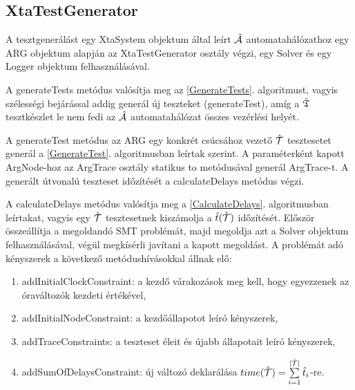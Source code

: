 \subsection{XtaTestGenerator}
A tesztgenerálást egy \textsf{XtaSystem} objektum által leírt $\hat{\mathcal{A}}$ automatahálózathoz egy \textsf{ARG} objektum alapján az \textsf{XtaTestGenerator} osztály végzi, egy \textsf{Solver} és egy \textsf{Logger} objektum felhasználásával.

A \textsf{generateTests} metódus valósítja meg az \ref{GenerateTests}. algoritmust, vagyis szélességi bejárással addig generál új teszteket (\textsf{generateTest}), amíg a $\hat{\mathfrak{T}}$ tesztkészlet le nem fedi az $\hat{\mathcal{A}}$ automatahálózat összes vezérlési helyét.

A \textsf{generateTest} metódus az ARG egy konkrét csúcsához vezető $\hat{\mathcal{T}}$ tesztesetet generál a \ref{GenerateTest}. algoritmusban leírtak szerint. A paraméterként kapott \textsf{ArgNode}-hoz az \textsf{ArgTrace} osztály statikus \textsf{to} metódusával generál \textsf{ArgTrace}-t. A generált útvonalú teszteset időzítését a \textsf{calculateDelays} metódus végzi.

A \textsf{calculateDelays} metódus valósítja meg a \ref{CalculateDelays}. algoritmusban leírtakat, vagyis egy $\hat{\mathcal{T}}$ tesztesetnek kiszámolja a $\hat{t}(\hat{\mathcal{T}})$ időzítését. Először összeállítja a megoldandó SMT problémát, majd megoldja azt a \textsf{Solver} objektum felhasználásával, végül megkísérli javítani a kapott megoldást. A problémát adó kényszerek a következő metódushívásokkal állnak elő:
\begin{enumerate}
    \item \textsf{addInitialClockConstraint}: a kezdő várakozások meg kell, hogy egyezzenek az óraváltozók kezdeti értékével,
    \item \textsf{addInitialNodeConstraint}: a kezdőállapotot leíró kényszerek,
    \item \textsf{addTraceConstraints}: a teszteset éleit és újabb állapotait leíró kényszerek,
    \item \textsf{addSumOfDelaysConstraint}: új változó deklarálása $time(\hat{\mathcal{T}}) = \sum\limits_{i = 1}^{|\hat{\mathcal{T}}|} \hat{t}_i$-re.
\end{enumerate}

